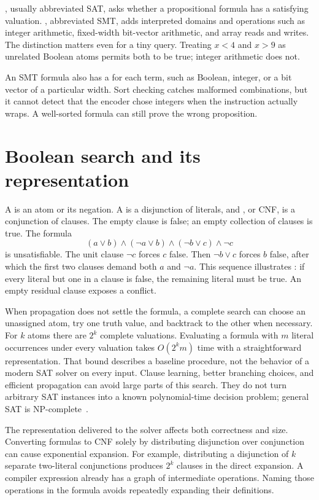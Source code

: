 , usually abbreviated SAT, asks whether a propositional formula has a satisfying valuation.
, abbreviated SMT, adds interpreted domains and operations such as integer arithmetic, fixed-width bit-vector arithmetic, and array reads and writes.
The distinction matters even for a tiny query.
Treating $x<4$ and $x>9$ as unrelated Boolean atoms permits both to be true; integer arithmetic does not.

An SMT formula also has a  for each term, such as Boolean, integer, or a bit vector of a particular width.
Sort checking catches malformed combinations, but it cannot detect that the encoder chose integers when the instruction actually wraps.
A well-sorted formula can still prove the wrong proposition.

\section{Boolean search and its representation}
\label{sec:ch41-sat}

A  is an atom or its negation.
A  is a disjunction of literals, and , or CNF, is a conjunction of clauses.
The empty clause is false; an empty collection of clauses is true.
The formula
\[
 (a\lor b)\land(\neg a\lor b)\land(\neg b\lor c)\land\neg c
\]
is unsatisfiable.
The unit clause $\neg c$ forces $c$ false.
Then $\neg b\lor c$ forces $b$ false, after which the first two clauses demand both $a$ and $\neg a$.
This sequence illustrates : if every literal but one in a clause is false, the remaining literal must be true.
An empty residual clause exposes a conflict.

When propagation does not settle the formula, a complete search can choose an unassigned atom, try one truth value, and backtrack to the other when necessary.
For $k$ atoms there are $2^k$ complete valuations.
Evaluating a formula with $m$ literal occurrences under every valuation takes $O(2^k m)$ time with a straightforward representation.
That bound describes a baseline procedure, not the behavior of a modern SAT solver on every input.
Clause learning, better branching choices, and efficient propagation can avoid large parts of this search.
They do not turn arbitrary SAT instances into a known polynomial-time decision problem; general SAT is NP-complete~\cite{huth-2004-logic}.

The representation delivered to the solver affects both correctness and size.
Converting formulas to CNF solely by distributing disjunction over conjunction can cause exponential expansion.
For example, distributing a disjunction of $k$ separate two-literal conjunctions produces $2^k$ clauses in the direct expansion.
A compiler expression already has a graph of intermediate operations.
Naming those operations in the formula avoids repeatedly expanding their definitions.

